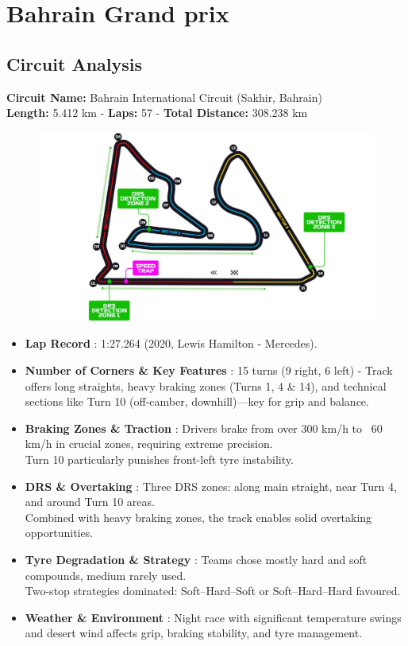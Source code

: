 \section{Bahrain Grand prix}

\subsection{Circuit Analysis}

\textbf{Circuit Name:} Bahrain International Circuit (Sakhir, Bahrain) \\
\textbf{Length:} 5.412 km - \textbf{Laps:} 57 - \textbf{Total Distance:} 308.238 km

\begin{figure}[H]
    \centering
    \includegraphics[width=0.75\linewidth]{images/1.Bahrain_Circuit.jpg}
\end{figure}

\begin{itemize}
    \item \textbf{Lap Record} : 1:27.264 (2020, Lewis Hamilton - Mercedes).
    
    \item \textbf{Number of Corners \& Key Features} : 15 turns (9 right, 6 left) - Track offers long straights, heavy braking zones (Turns 1, 4 \& 14), and technical sections like Turn 10 (off-camber, downhill)—key for grip and balance.
    
    \item \textbf{Braking Zones \& Traction} : Drivers brake from over 300 km/h to ~60 km/h in crucial zones, requiring extreme precision.\\
    Turn 10 particularly punishes front-left tyre instability.
    
    \item \textbf{DRS \& Overtaking} : Three DRS zones: along main straight, near Turn 4, and around Turn 10 areas. \\
    Combined with heavy braking zones, the track enables solid overtaking opportunities.
    
    \item \textbf{Tyre Degradation \& Strategy} : Teams chose mostly hard and soft compounds, medium rarely used. \\
    Two-stop strategies dominated: Soft–Hard–Soft or Soft–Hard–Hard favoured.
    
    \item \textbf{Weather \& Environment} : Night race with significant temperature swings and desert wind affects grip, braking stability, and tyre management.
\end{itemize}

